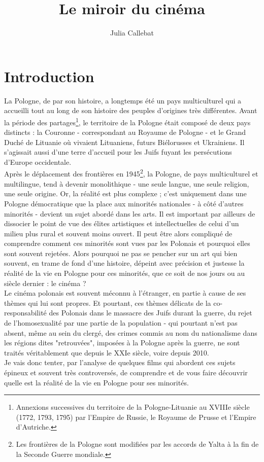 \documentclass[12pt, twocolumn]{amsart}
\title{Le miroir du cinéma}
\author{Julia Callebat}
\begin{document}
\maketitle

\cleardoublepage
\onecolumn
\tableofcontents


\cleardoublepage
\twocolumn
\section*{Introduction}
\vspace*{10mm}
La Pologne, de par son histoire, a longtemps été un pays multiculturel qui a accueilli tout au long de son histoire des peuples d'origines très différentes. Avant la période des partages\footnote{Annexions successives du territoire de la Pologne-Lituanie au XVIIIe siècle (1772, 1793, 1795) par l'Empire de Russie, le Royaume de Prusse et l'Empire d'Autriche.}, le territoire de la Pologne était composé de deux pays distincts : la Couronne - correspondant au Royaume de Pologne - et le Grand Duché de Lituanie où vivaient Lituaniens, futurs Biélorusses et Ukrainiens. Il s'agissait aussi d'une terre d'accueil pour les Juifs fuyant les persécutions d'Europe occidentale. \\
Après le déplacement des frontières en 1945\footnote{Les frontières de la Pologne sont modifiées par les accords de Yalta à la fin de la Seconde Guerre mondiale.}, la Pologne, de pays multiculturel et multilingue, tend à devenir monolithique - une seule langue, une seule religion, une seule origine. Or, la réalité est plus complexe ; c'est uniquement dans une Pologne démocratique que la place aux minorités nationales - à côté d'autres minorités - devient un sujet abordé dans les arts. Il est important par ailleurs de dissocier le point de vue des élites artistiques et intellectuelles de celui d'un milieu plus rural et souvent moins ouvert. Il peut être alors compliqué de comprendre comment ces minorités sont vues par les Polonais et pourquoi elles sont souvent rejetées. Alors pourquoi ne pas se pencher sur un art qui bien souvent, en trame de fond d'une histoire, dépeint avec précision et justesse la réalité de la vie en Pologne pour ces minorités, que ce soit de nos jours ou au siècle dernier : le cinéma ?\\
Le cinéma polonais est souvent méconnu à l'étranger, en partie à cause de ses thèmes qui lui sont propres. Et pourtant, ces thèmes délicats de la co-responsabilité des Polonais dans le massacre des Juifs durant la guerre, du rejet de l'homosexualité par une partie de la population - qui pourtant n'est pas absent, même au sein du clergé, des crimes commis au nom du nationalisme dans les régions dites "retrouvées", imposées à la Pologne après la guerre, ne sont traités véritablement que depuis le XXIe siècle, voire depuis 2010. \\
Je vais donc tenter, par l'analyse de quelques films qui abordent ces sujets épineux et souvent très controversés, de comprendre et de vous faire découvrir quelle est la réalité de la vie en Pologne pour ses minorités. 
\end{document}
